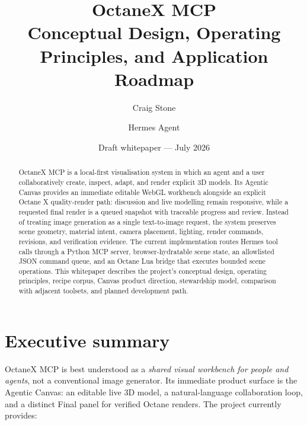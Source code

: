 \documentclass[11pt,a4paper]{article}
\title{\vspace{-1em}\textbf{OctaneX MCP}\\[0.35em]
\large Conceptual Design, Operating Principles, and Application Roadmap}
\author{Craig Stone \and Hermes Agent}
\date{Draft whitepaper --- July 2026}
\newcommand{\project}{OctaneX MCP}
\begin{document}
\maketitle

\begin{abstract}
\project{} is a local-first visualisation system in which an agent and a user collaboratively create, inspect, adapt, and render explicit 3D models. Its Agentic Canvas provides an immediate editable WebGL workbench alongside an explicit Octane X quality-render path: discussion and live modelling remain responsive, while a requested final render is a queued snapshot with traceable progress and review. Instead of treating image generation as a single text-to-image request, the system preserves scene geometry, material intent, camera placement, lighting, render commands, revisions, and verification evidence. The current implementation routes Hermes tool calls through a Python MCP server, browser-hydratable scene state, an allowlisted JSON command queue, and an Octane Lua bridge that executes bounded scene operations. This whitepaper describes the project's conceptual design, operating principles, recipe corpus, Canvas product direction, stewardship model, comparison with adjacent toolsets, and planned development path.
\end{abstract}

\tableofcontents
\newpage

\section{Executive summary}

\project{} is best understood as a \emph{shared visual workbench for people and agents}, not a conventional image generator. Its immediate product surface is the Agentic Canvas: an editable live 3D model, a natural-language collaboration loop, and a distinct Final panel for verified Octane renders. The project currently provides:
\end{document}
